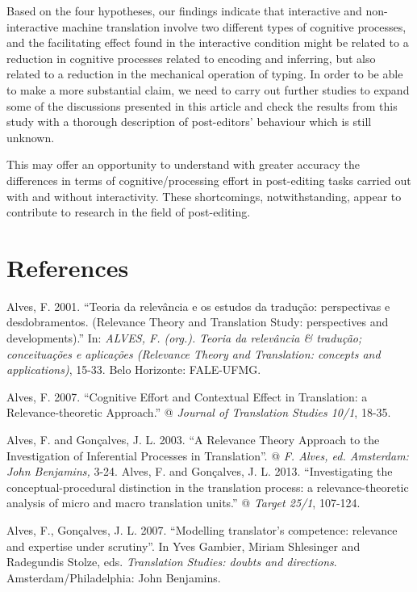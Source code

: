 \documentclass[output=paper]{langsci/langscibook}
\begin{document}
Based on the four hypotheses, our findings indicate that interactive and non-interactive machine translation involve two different types of cognitive processes, and the facilitating effect found in the interactive condition might be related to a reduction in cognitive processes related to encoding and inferring, but also related to a reduction in the mechanical operation of typing. In order to be able to make a more substantial claim, we need to carry out further studies to expand some of the discussions presented in this article and check the results from this study with a thorough description of post-editors’ behaviour which is still unknown.  



This may offer an opportunity to understand with greater accuracy the differences in terms of cognitive/processing effort in post-editing tasks carried out with and without interactivity. These shortcomings, notwithstanding, appear to contribute to research in the field of post-editing.


\section{References}


Alves, F. 2001. “Teoria da relevância e os estudos da tradução: perspectivas e desdobramentos. (Relevance Theory and Translation Study: perspectives and developments).” In: \textit{ALVES, F. (org.). }\textit{Teoria da relevância \& tradução; conceituações e aplicações (Relevance Theory and Translation: concepts and applications)}, 15-33. Belo Horizonte: FALE-UFMG.



Alves, F. 2007. “Cognitive Effort and Contextual Effect in Translation: a Relevance-theoretic Approach.” @ \textit{Journal of Translation Studies 10/1}, 18-35.



Alves, F. and Gonçalves, J. L. 2003. “A Relevance Theory Approach to the Investigation of Inferential Processes in Translation”. @ \textit{F. Alves, ed. Amsterdam: John Benjamins, }3-24. Alves, F. and Gonçalves, J. L. 2013. “Investigating the conceptual-procedural distinction in the translation process: a relevance-theoretic analysis of micro and macro translation units.” @ \textit{Target 25/1}, 107-124. 



Alves, F., Gonçalves, J. L. 2007. “Modelling translator’s competence: relevance and expertise under scrutiny”. In Yves Gambier, Miriam Shlesinger and Radegundis Stolze, eds. \textit{Translation Studies: doubts and directions}. Amsterdam/Philadelphia: John Benjamins.
\end{document}

